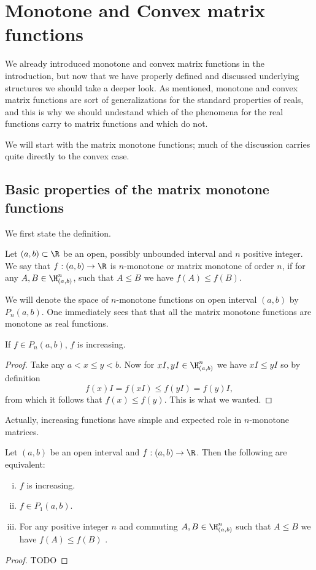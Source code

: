 \chapter{Monotone and Convex matrix functions}

We already introduced monotone and convex matrix functions in the introduction, but now that we have properly defined and discussed underlying structures we should take a deeper look. As mentioned, monotone and convex matrix functions are sort of generalizations for the standard properties of reals, and this is why we should undestand which of the phenomena for the real functions carry to matrix functions and which do not.

We will start with the matrix monotone functions; much of the discussion carries quite directly to the convex case.

\section{Basic properties of the matrix monotone functions}

We first state the definition.

\begin{maar}
	Let $(a,b) \subset \R$ be an open, possibly unbounded interval and $n$ positive integer. We say that $f : (a, b) \to \R$ is $n$-monotone or matrix monotone of order $n$, if for any $A, B \in \H^{n}_{(a, b)}$, such that $A \leq B$ we have $f(A) \leq f(B)$.
\end{maar}

We will denote the space of $n$-monotone functions on open interval $(a, b)$ by $P_{n}(a, b)$. One immediately sees that that all the matrix monotone functions are monotone as real functions.

\begin{prop}
	If $f \in P_{n}(a, b)$, $f$ is increasing.
\end{prop}
\begin{proof}
	Take any $a < x \leq y < b$. Now for $xI, yI \in \H^{n}_{(a, b)}$ we have $x I \leq y I$ so by definition
	\[
		f(x) I = f(xI) \leq f(y I) = f(y) I,
	\]
	from which it follows that $f(x) \leq f(y)$. This is what we wanted.
\end{proof}

Actually, increasing functions have simple and expected role in $n$-monotone matrices.

\begin{prop}
	Let $(a, b)$ be an open interval and $f : (a, b) \to \R$. Then the following are equivalent:
	\begin{enumerate}[(i)]
		\item $f$ is increasing.
		\item $f \in P_{1}(a, b)$.
		\item For any positive integer $n$ and commuting $A, B \in \H^{n}_{(a, b)}$ such that $A \leq B$ we have $f(A) \leq f(B)$ .
	\end{enumerate}
\end{prop}
\begin{proof}
	TODO
\end{proof}

